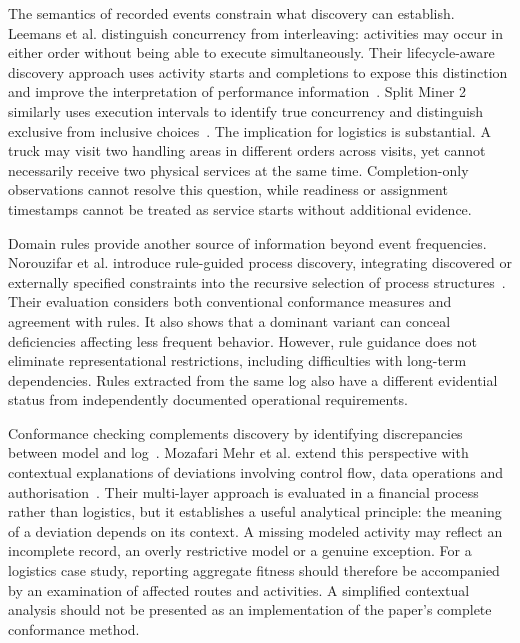 The semantics of recorded events constrain what discovery can establish. Leemans et al. distinguish concurrency from interleaving: activities may occur in either order without being able to execute simultaneously. Their lifecycle-aware discovery approach uses activity starts and completions to expose this distinction and improve the interpretation of performance information~\cite{RWLeemans2016Lifecycle}. Split Miner 2 similarly uses execution intervals to identify true concurrency and distinguish exclusive from inclusive choices~\cite{RWSplitMiner2Preprint}. The implication for logistics is substantial. A truck may visit two handling areas in different orders across visits, yet cannot necessarily receive two physical services at the same time. Completion-only observations cannot resolve this question, while readiness or assignment timestamps cannot be treated as service starts without additional evidence.

Domain rules provide another source of information beyond event frequencies. Norouzifar et al. introduce rule-guided process discovery, integrating discovered or externally specified constraints into the recursive selection of process structures~\cite{RWNorouzifar2026Rules}. Their evaluation considers both conventional conformance measures and agreement with rules. It also shows that a dominant variant can conceal deficiencies affecting less frequent behavior. However, rule guidance does not eliminate representational restrictions, including difficulties with long-term dependencies. Rules extracted from the same log also have a different evidential status from independently documented operational requirements.

Conformance checking complements discovery by identifying discrepancies between model and log~\cite{aalst2012ConformanceChecking}. Mozafari Mehr et al. extend this perspective with contextual explanations of deviations involving control flow, data operations and authorisation~\cite{RWMehr2023Explainable}. Their multi-layer approach is evaluated in a financial process rather than logistics, but it establishes a useful analytical principle: the meaning of a deviation depends on its context. A missing modeled activity may reflect an incomplete record, an overly restrictive model or a genuine exception. For a logistics case study, reporting aggregate fitness should therefore be accompanied by an examination of affected routes and activities. A simplified contextual analysis should not be presented as an implementation of the paper's complete conformance method.

